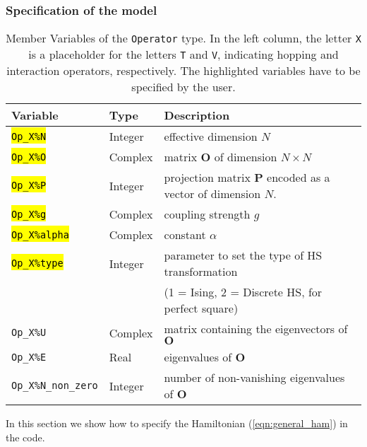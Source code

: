 \subsubsection{Specification of the model}\label{sec:specific}
%
\begin{table}[h]
    \begin{tabular}{@{} l l l @{}}\toprule
    Variable & Type & Description \\\midrule
    \hl{\texttt{Op\_X\%N}}       & Integer     &  effective dimension $N$ \\
    \hl{\texttt{Op\_X\%O}}       & Complex    &  matrix  $\mathbf{O}$  of dimension $N \times N$\\
    \hl{\texttt{Op\_X\%P}}       & Integer   &  projection matrix $\mathbf{P}$  encoded as a vector of dimension $N$.\\
    \hl{\texttt{Op\_X\%g}}       & Complex    &  coupling strength $g$ \\  
    \hl{\texttt{Op\_X\%alpha}}   & Complex  &  constant $\alpha$ \\
    \hl{\texttt{Op\_X\%type}}    & Integer   &  parameter to set the type of 
                                             HS transformation\\
                             &   &  (1 = Ising, 2 = Discrete HS, for perfect square)  \\ 
    \texttt{Op\_X\%U}            & Complex &  matrix containing the eigenvectors of $\mathbf{O}$  \\
    \texttt{Op\_X\%E}            & Real &  eigenvalues of $\mathbf{O}$ \\
    \texttt{Op\_X\%N\_non\_zero} & Integer &  number of non-vanishing eigenvalues of $\mathbf{O}$ \\\bottomrule
   \end{tabular}
   \caption{Member Variables of the \texttt{Operator}  type. 
   In the left column, the letter \texttt{X} is a placeholder for the letters \texttt{T} and \texttt{V}, 
   indicating hopping and interaction operators, respectively.
   The highlighted variables have to be specified by the user.
    \label{table:operator}}
\end{table}
%
In this section we show how to specify the  Hamiltonian (\ref{eqn:general_ham}) in the code. 

